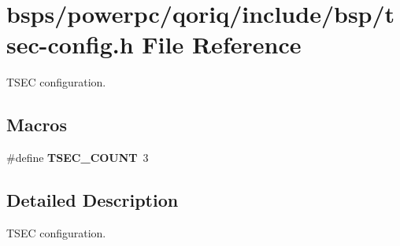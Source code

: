 \hypertarget{qoriq_2include_2bsp_2tsec-config_8h}{}\section{bsps/powerpc/qoriq/include/bsp/tsec-\/config.h File Reference}
\label{qoriq_2include_2bsp_2tsec-config_8h}


T\+S\+EC configuration.  


\subsection*{Macros}
\begin{DoxyCompactItemize}
\item 
\mbox{\label{qoriq_2include_2bsp_2tsec-config_8h_abf321d4b4f6af69cd6fd2ef691547f41}} 
\#define {\bfseries T\+S\+E\+C\+\_\+\+C\+O\+U\+NT}~3
\end{DoxyCompactItemize}


\subsection{Detailed Description}
T\+S\+EC configuration. 

